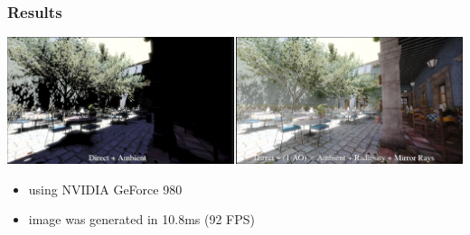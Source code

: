 \documentclass{beamer}
\begin{document}
	\begin{frame}
		\frametitle{Results}
		\includegraphics[width=\textwidth]{img/deep_g_buffer_render.png}
		\begin{itemize}
			\item using NVIDIA GeForce 980
			\item image was generated in 10.8ms (92 FPS)
		\end{itemize}
	\end{frame}
\end{document}
